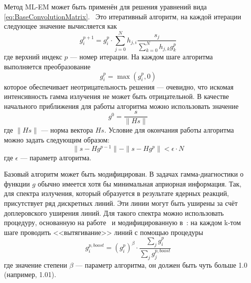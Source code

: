 Метод ML-EM \cite{Vardi1985,Richardson1972,Lucy1974} может быть применён для решения уравнений вида \ref{eq:BaseConvolutionMatrix}.~\cite{Khilkevitch2013,Shevelev2013} Это итеративный алгоритм, на каждой итерации следующее значение вычисляется как
\begin{equation*}
  g_i^{p+1} = g_i^p \cdot \sum \limits_{j = 0 }^{N} h_{j,i} \frac{ s_j }{ \sum \limits_{k=0}^{N} h_{j,k} g_k^p }
\end{equation*}
где верхний индекс $p$ --- номер итерации. На каждом шаге алгоритма выполняется преобразование 
\begin{equation*}
  g_i^p = \max \left( g_i^p, 0 \right)
\end{equation*}
которое обеспечивает неотрицательность решения --- очевидно, что искомая интенсивность гамма излучения не может быть отрицательной. В качестве начального приближения для работы алгоритма можно использовать значение
\begin{equation*}
  g^0 = \frac{ s }{ \| H s \| }
\end{equation*}
где $ \| H s \| $ --- норма вектора $ H s $. Условие для окончания работы алгоритма можно задать следующим образом:
\begin{equation*}
  \| s - H g^{p-1} \| - \| s - H g^p \| < \epsilon \cdot N
\end{equation*}
где $\epsilon$ --- параметр алгоритма.~\cite{Shevelev2013} 

Базовый алгоритм может быть модифицирован. В задачах гамма-диагностики о функции $g$ обычно имеется хотя бы минимальная априорная информация. Так, для спектра излучения, который образуется в результате ядерных реакций, присутствует ряд дискретных линий. Эти линии могут быть уширены за счёт доплеровского уширения линий. Для такого спектра можно использовать процедуру, основанную на работе~\cite{Morhac2011} и модифицированную в~\cite{Khilkevitch2013,Shevelev2013}: на каждом k-том шаге проводить <<вытягивание>> линий с помощью процедуры
\begin{equation*}
  g^{p, boost}_i = \left( g^p_i \right)^{\beta} \cdot \frac{ \sum_j g^p_i }{ \sum_j g^{p, boost}_j }
\end{equation*}
где значение степени $\beta$ --- параметр алгоритма, он должен быть чуть больше 1.0 (например, 1.01). 

